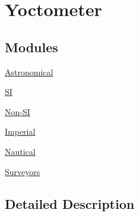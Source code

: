 \hypertarget{group___e_g_x_math-_conversions-_length_conversions-_s_i-_yoctometer}{}\section{Yoctometer}
\label{group___e_g_x_math-_conversions-_length_conversions-_s_i-_yoctometer}
\subsection*{Modules}
\begin{DoxyCompactItemize}
\item 
\mbox{\hyperlink{group___e_g_x_math-_conversions-_length_conversions-_s_i-_yoctometer-_astronomical}{Astronomical}}
\item 
\mbox{\hyperlink{group___e_g_x_math-_conversions-_length_conversions-_s_i-_yoctometer-_s_i}{SI}}
\item 
\mbox{\hyperlink{group___e_g_x_math-_conversions-_length_conversions-_s_i-_yoctometer-_non-_s_i}{Non-\/\+SI}}
\item 
\mbox{\hyperlink{group___e_g_x_math-_conversions-_length_conversions-_s_i-_yoctometer-_imperial}{Imperial}}
\item 
\mbox{\hyperlink{group___e_g_x_math-_conversions-_length_conversions-_s_i-_yoctometer-_nautical}{Nautical}}
\item 
\mbox{\hyperlink{group___e_g_x_math-_conversions-_length_conversions-_s_i-_yoctometer-_surveyors}{Surveyors}}
\end{DoxyCompactItemize}


\subsection{Detailed Description}

